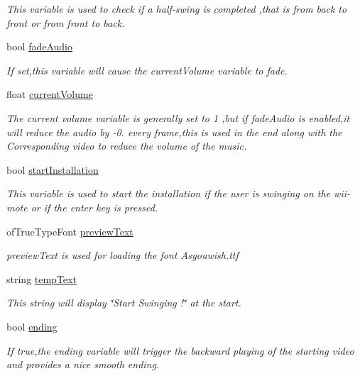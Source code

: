 \begin{DoxyCompactItemize}
\begin{DoxyCompactList}\small\item\em This variable is used to check if a half-\/swing is completed ,that is from back to front or from front to back. \end{DoxyCompactList}\item 
bool \hyperlink{classtest_app_a918c09b5a4389a8402cfacb25d390226}{fade\-Audio}
\begin{DoxyCompactList}\small\item\em If set,this variable will cause the current\-Volume variable to fade. \end{DoxyCompactList}\item 
float \hyperlink{classtest_app_a51c20c5432d9f6b06f719526d9a34ee6}{current\-Volume}
\begin{DoxyCompactList}\small\item\em The current volume variable is generally set to 1 ,but if fade\-Audio is enabled,it will reduce the audio by -\/0. every frame,this is used in the end along with the Corresponding video to reduce the volume of the music. \end{DoxyCompactList}\item 
bool \hyperlink{classtest_app_a8a65a6d1a473417cec1c2ac2e6116aae}{start\-Installation}
\begin{DoxyCompactList}\small\item\em This variable is used to start the installation if the user is swinging on the wii-\/mote or if the enter key is pressed. \end{DoxyCompactList}\item 
of\-True\-Type\-Font \hyperlink{classtest_app_af5b1af55af2256ef3751de075fc7a9cc}{preview\-Text}
\begin{DoxyCompactList}\small\item\em preview\-Text is used for loading the font Asyouwish.\-ttf \end{DoxyCompactList}\item 
string \hyperlink{classtest_app_ad9a4beab6f2e0f13d32b00b502e89bdc}{temp\-Text}
\begin{DoxyCompactList}\small\item\em This string will display \char`\"{}\-Start Swinging !\char`\"{} at the start. \end{DoxyCompactList}\item 
bool \hyperlink{classtest_app_acf09303bc452d2a38098f6bf94655408}{ending}
\begin{DoxyCompactList}\small\item\em If true,the ending variable will trigger the backward playing of the starting video and provides a nice smooth ending. \end{DoxyCompactList}\item 

\end{DoxyCompactItemize}
